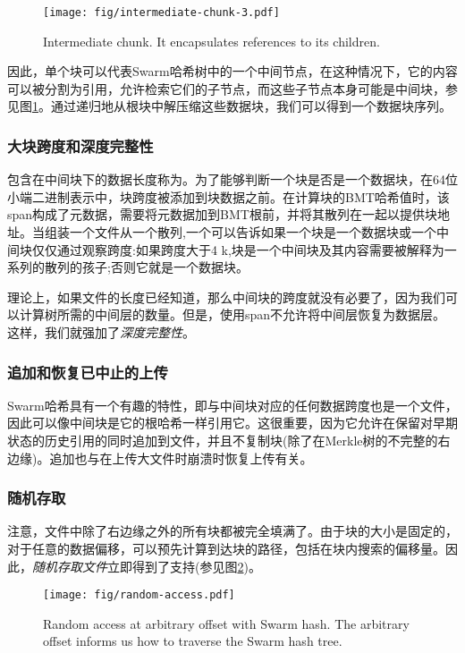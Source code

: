 \begin{figure}[htbp]
\centering
\texttt{[image: fig/intermediate-chunk-3.pdf]}
\caption[Intermediate chunk \statusgreen]{Intermediate chunk. It encapsulates references to its children.}
\label{fig:intermediate-chunk}
\end{figure}

因此，单个块可以代表Swarm哈希树中的一个中间节点，在这种情况下，它的内容可以被分割为引用，允许检索它们的子节点，而这些子节点本身可能是中间块，参见图\ref{fig:intermediate-chunk}。通过递归地从根块中解压缩这些数据块，我们可以得到一个数据块序列。 

 \subsubsection{大块跨度和深度完整性}

包含在中间块下的数据长度称为。为了能够判断一个块是否是一个数据块，在64位小端二进制表示中，块跨度被添加到块数据之前。在计算块的BMT哈希值时，该span构成了元数据，需要将元数据加到BMT根前，并将其散列在一起以提供块地址。当组装一个文件从一个散列,一个可以告诉如果一个块是一个数据块或一个中间块仅仅通过观察跨度:如果跨度大于4 k,块是一个中间块及其内容需要被解释为一系列的散列的孩子;否则它就是一个数据块。

理论上，如果文件的长度已经知道，那么中间块的跨度就没有必要了，因为我们可以计算树所需的中间层的数量。但是，使用span不允许将中间层恢复为数据层。这样，我们就强加了\emph{深度完整性}。 

\subsubsection{追加和恢复已中止的上传}

Swarm哈希具有一个有趣的特性，即与中间块对应的任何数据跨度也是一个文件，因此可以像中间块是它的根哈希一样引用它。这很重要，因为它允许在保留对早期状态的历史引用的同时追加到文件，并且不复制块(除了在Merkle树的不完整的右边缘)。追加也与在上传大文件时崩溃时恢复上传有关。

\subsubsection{随机存取}

注意，文件中除了右边缘之外的所有块都被完全填满了。由于块的大小是固定的，对于任意的数据偏移，可以预先计算到达块的路径，包括在块内搜索的偏移量。因此，\emph{随机存取文件}立即得到了支持(参见图\ref{fig:random-access})。


\begin{figure}[htbp]
\centering
\texttt{[image: fig/random-access.pdf]}
\caption[Random access at arbitrary offset with Swarm hash \statusgreen]{Random access at arbitrary offset with Swarm hash. The arbitrary offset informs us how to traverse the Swarm hash tree.}
\label{fig:random-access}
\end{figure}

